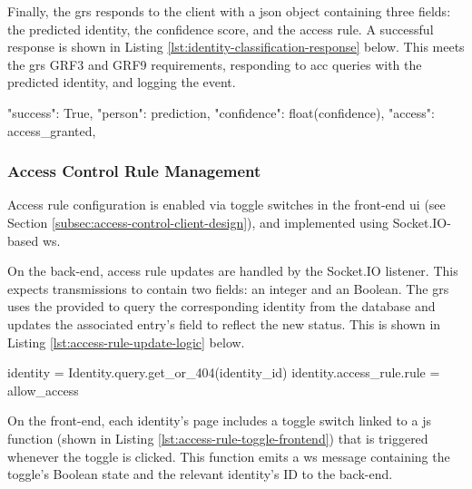 Finally, the \ac{grs} responds to the client with a \ac{json} object containing three fields: the predicted identity, the confidence score, and the access rule.
A successful response is shown in Listing \ref{lst:identity-classification-response} below.
This meets the \ac{grs} GRF3 and GRF9 requirements, responding to \ac{acc} queries with the predicted identity, and logging the event. 

\begin{code}[minted language=text]
"success": True,
"person": prediction,
"confidence": float(confidence),
"access": access_granted,
\end{code}
\label{lst:identity-classification-response} \vspace{10pt}


\subsubsection{Access Control Rule Management}
\label{subsubsec:access-control-rule-management}

Access rule configuration is enabled via toggle switches in the front-end \ac{ui} (see Section \ref{subsec:access-control-client-design}), and implemented using Socket.IO-based \acf{ws}.

On the back-end, access rule updates are handled by the  Socket.IO listener.
This expects transmissions to contain two fields: an  integer and an  Boolean.
The \ac{grs} uses the provided  to query the corresponding identity from the database and updates the associated  entry's  field to reflect the new status.
This is shown in Listing \ref{lst:access-rule-update-logic} below.

\begin{code}
identity = Identity.query.get_or_404(identity_id)
identity.access_rule.rule = allow_access
\end{code}
\label{lst:access-rule-update-logic} \vspace{10pt}

On the front-end, each identity's page includes a toggle switch linked to a \ac{js} function (shown in Listing \ref{lst:access-rule-toggle-frontend}) that is triggered whenever the toggle is clicked.
This function emits a \ac{ws} message containing the toggle's Boolean state and the relevant identity's ID to the back-end.

